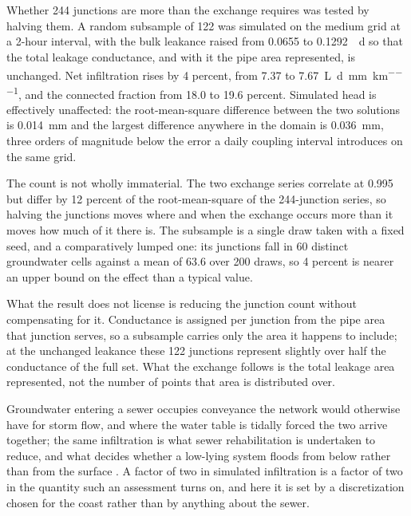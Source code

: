 \documentclass[preprint,authoryear,11pt]{elsarticle}
\begin{document}
Whether 244 junctions are more than the exchange requires was tested by halving them. A random subsample of 122 was simulated on the medium grid at a 2-hour interval, with the bulk leakance raised from 0.0655 to \SI{0.1292}{\per\day} so that the total leakage conductance, and with it the pipe area represented, is unchanged. Net infiltration rises by 4 percent, from 7.37 to \SI{7.67}{\liter\per\day\per\milli\meter\per\kilo\meter}, and the connected fraction from 18.0 to 19.6 percent. Simulated head is effectively unaffected: the root-mean-square difference between the two solutions is \SI{0.014}{\milli\meter} and the largest difference anywhere in the domain is \SI{0.036}{\milli\meter}, three orders of magnitude below the error a daily coupling interval introduces on the same grid.

The count is not wholly immaterial. The two exchange series correlate at 0.995 but differ by 12 percent of the root-mean-square of the 244-junction series, so halving the junctions moves where and when the exchange occurs more than it moves how much of it there is. The subsample is a single draw taken with a fixed seed, and a comparatively lumped one: its junctions fall in 60 distinct groundwater cells against a mean of 63.6 over 200 draws, so 4 percent is nearer an upper bound on the effect than a typical value.

What the result does not license is reducing the junction count without compensating for it. Conductance is assigned per junction from the pipe area that junction serves, so a subsample carries only the area it happens to include; at the unchanged leakance these 122 junctions represent slightly over half the conductance of the full set. What the exchange follows is the total leakage area represented, not the number of points that area is distributed over.

Groundwater entering a sewer occupies conveyance the network would otherwise have for storm flow, and where the water table is tidally forced the two arrive together; the same infiltration is what sewer rehabilitation is undertaken to reduce, and what decides whether a low-lying system floods from below rather than from the surface \citep{liu2018gwsewer, su2019infiltration, liu2021predicting, su2022slr}. A factor of two in simulated infiltration is a factor of two in the quantity such an assessment turns on, and here it is set by a discretization chosen for the coast rather than by anything about the sewer.
\end{document}
